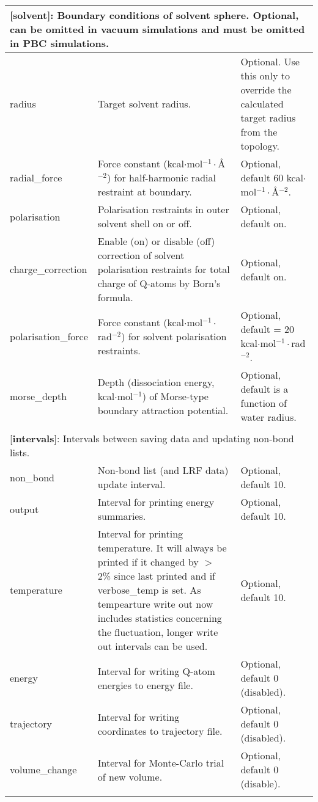 \documentclass[a4paper,11pt]{article}
\begin{document}
\begin{longtable}{|p{78pt}|p{158pt}|p{158pt}|}
\multicolumn{3}{p{394pt}}{[\textbf{solvent}]: Boundary conditions of solvent sphere. Optional, can be omitted in vacuum simulations and must be omitted in PBC simulations.}\\
\hline radius & Target solvent radius. &  Optional. Use this only to override the calculated target radius from the topology.\\
\hline radial\_force & Force constant (kcal$\cdot$mol$^{-1}\cdot${\AA}$^{-2}$) for half-harmonic radial restraint at boundary. & Optional, default 60 kcal$\cdot$mol$^{-1}\cdot${\AA}$^{-2}$.\\
\hline polarisation & Polarisation restraints in outer solvent shell on or off. & Optional, default on.\\
\hline charge\_correction &  Enable (on) or disable (off) correction of solvent polarisation restraints for total charge of Q-atoms by Born's formula. & Optional, default on.\\
\hline polarisation\_force & Force constant (kcal$\cdot$mol$^{-1}\cdot$rad$^{-2}$) for solvent polarisation restraints. & Optional, default = 20 kcal$\cdot$mol$^{-1}\cdot$rad$^{-2}$.\\
\hline morse\_depth & Depth (dissociation energy, kcal$\cdot$mol$^{-1}$) of Morse-type boundary attraction potential. & Optional, default is a function of water radius.\\
\hline
\multicolumn{3}{p{394pt}}{}\\

\multicolumn{3}{p{394pt}}{[\textbf{intervals}]: Intervals between saving data and updating non-bond lists.}\\
\hline non\_bond & Non-bond list (and LRF data) update interval. & Optional, default 10.\\
\hline output & Interval for printing energy summaries. & Optional, default 10.\\
\hline temperature & Interval for printing temperature. It will always be printed if it changed by $>$ 2\% since last printed and if verbose{\_}temp is set. As tempearture write out now includes statistics concerning the fluctuation,
longer write out intervals can be used. & Optional, default 10.\\
\hline energy & Interval for writing Q-atom energies to energy file. & Optional, default 0 (disabled).\\
\hline trajectory & Interval for writing coordinates to trajectory file. & Optional, default 0 (disabled).\\
\hline volume\_change & Interval for Monte-Carlo trial of new volume. & Optional, default 0 (disable).\\
\hline
\multicolumn{3}{p{394pt}}{}\\


\end{longtable}
\end{document}
